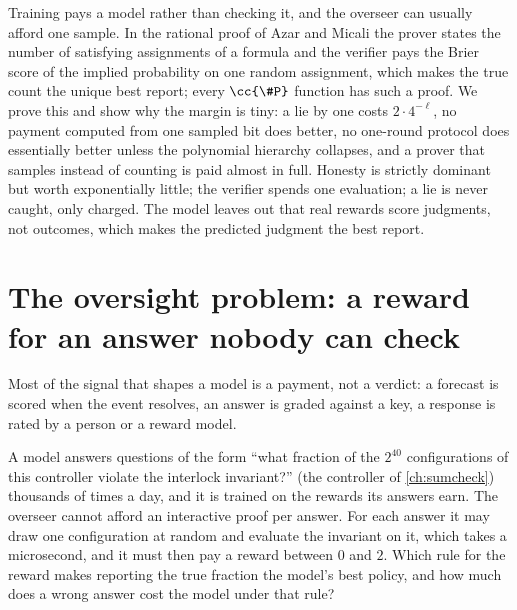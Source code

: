 \newcommand{\rationalKL}{\mathrm{KL}}
\newcommand{\rationalgap}{\operatorname{gap}}
\newcommand{\rationalS}{\bar S}

\begin{refsection}

\begin{chaptersummary}
Training pays a model rather than checking it, and the overseer can usually afford one sample. In the rational proof of Azar and Micali the prover states the number of satisfying assignments of a formula and the verifier pays the Brier score of the implied probability on one random assignment, which makes the true count the unique best report; every $\cc{\#P}$ function has such a proof. We prove this and show why the margin is tiny: a lie by one costs $2\cdot4^{-\ell}$, no payment computed from one sampled bit does better, no one-round protocol does essentially better unless the polynomial hierarchy collapses, and a prover that samples instead of counting is paid almost in full. Honesty is strictly dominant but worth exponentially little; the verifier spends one evaluation; a lie is never caught, only charged. The model leaves out that real rewards score judgments, not outcomes, which makes the predicted judgment the best report.
\end{chaptersummary}

\section{The oversight problem: a reward for an answer nobody can check}\label{sec:rational:problem}

Most of the signal that shapes a model is a payment, not a verdict: a forecast is scored when the event resolves, an answer is graded against a key, a response is rated by a person or a reward model.

\begin{oversight}
A model answers questions of the form ``what fraction of the $2^{40}$ configurations of this controller violate the interlock invariant?'' (the controller of \cref{ch:sumcheck}) thousands of times a day, and it is trained on the rewards its answers earn. The overseer cannot afford an interactive proof per answer. For each answer it may draw one configuration at random and evaluate the invariant on it, which takes a microsecond, and it must then pay a reward between $0$ and $2$. Which rule for the reward makes reporting the true fraction the model's best policy, and how much does a wrong answer cost the model under that rule?
\end{oversight}


\end{refsection}
